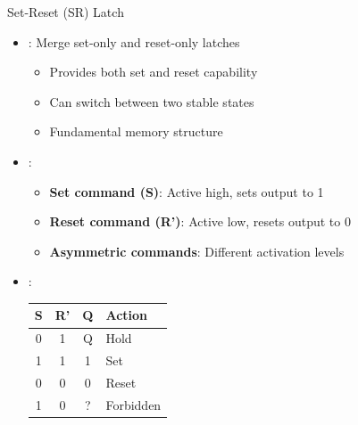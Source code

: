 \begin{frame}{Set-Reset (SR) Latch}
\begin{itemize}
\item {}: Merge set-only and reset-only latches
\begin{itemize}
\item Provides both set and reset capability
\item Can switch between two stable states
\item Fundamental memory structure
\end{itemize}
\vspace{0.5cm}
\item {}:
\begin{itemize}
\item \textbf{Set command (S)}: Active high, sets output to 1
\item \textbf{Reset command (R')}: Active low, resets output to 0
\item \textbf{Asymmetric commands}: Different activation levels
\end{itemize}
\vspace{0.3cm}
\item {}:
\begin{center}
\begin{tabular}{|c|c|c|l|}
\hline
S & R' & Q & Action \\
\hline
0 & 1 & Q & Hold \\
1 & 1 & 1 & Set \\
0 & 0 & 0 & Reset \\
1 & 0 & ? & Forbidden \\
\hline
\end{tabular}
\end{center}
\end{itemize}
\end{frame}

